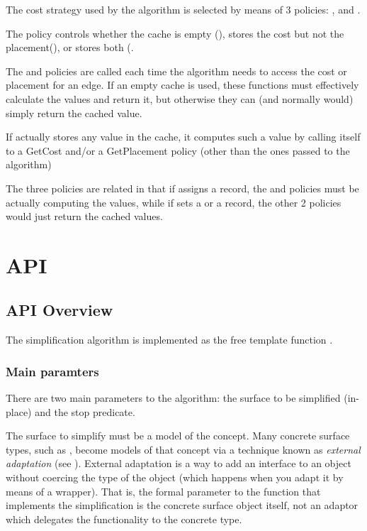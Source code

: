 The cost strategy used by the algorithm is selected by means of 3 policies: 
,  and . 

The  policy controls whether the cache is empty (), 
stores the cost but not the placement(), or stores both 
(.

The  and  policies are called each time
the algorithm needs to access the cost or placement for an edge.
If an empty cache is used, these functions must effectively
calculate the values and return it, but otherwise they can 
(and normally would) simply return the cached value.

If  actually stores any value in the cache, it computes
such a value by calling itself to a GetCost and/or a GetPlacement
policy (other than the ones passed to the algorithm)

The three policies are related in that if 
assigns a  record, the  and  policies
must be actually computing the values, while if  sets a 
 or a  record, 
the other 2 policies would just return the cached values.

\section{API}

\subsection{API Overview}

The simplification algorithm is implemented as the free template function 
.

\subsubsection{Main paramters}

There are two main parameters to the algorithm: the surface to be simplified (in-place) and the stop predicate.

The surface to simplify must be a model of the  concept. Many concrete surface types, such as , become models of that concept via a technique known as 
{\em external adaptation} (see ). External adaptation is a way to add an interface to an object without coercing the type of the object (which happens when you adapt it by means of a wrapper). That is, the formal parameter to the  function that implements the simplification is the concrete surface object itself, not an adaptor which delegates the functionality to the concrete type.

